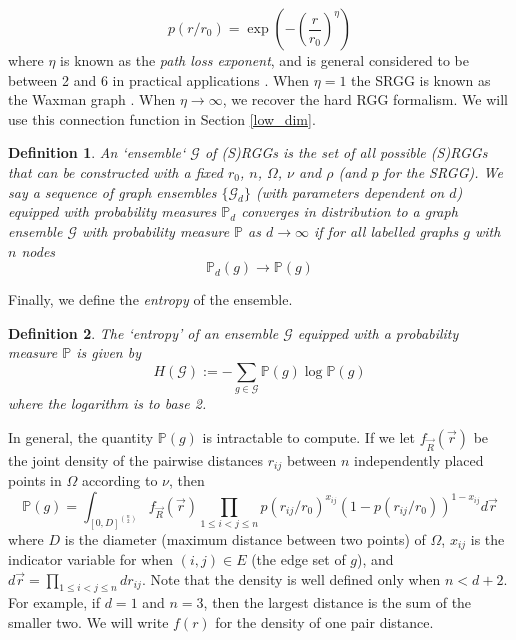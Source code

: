 \documentclass{article}
\newtheorem{definition}{Definition}
\newcommand{\tti}{\rightarrow\infty}
\newcommand{\graph}{\mathcal{G}}
\newcommand{\prob}[1]{\mathbb{P}\left(#1\right)}
\begin{document}
\begin{equation}
    p(r/r_0) = \exp\left(-\left(\frac{r}{r_0}\right)^\eta\right)
\end{equation}
where $\eta$ is known as the \textit{path loss exponent}, and is general considered to be between 2 and 6 in practical applications \cite{haenggi2009stochastic}. When $\eta=1$ the SRGG is known as the Waxman graph \cite{waxman1988routing}. When $\eta\tti$, we recover the hard RGG formalism. We will use this connection function in Section \ref{low_dim}. 
\begin{definition}
    An `ensemble` $\graph$ of (S)RGGs is the set of all possible (S)RGGs that can be constructed with a fixed $r_0$, $n$, $\Omega$, $\nu$ and $\rho$ (and $p$ for the SRGG). We say a sequence of graph ensembles $\{\graph_{d}\}$ (with parameters dependent on $d$) equipped with probability measures $\mathbb{P}_d$ converges in distribution to a graph ensemble $\graph$ with probability measure $\mathbb{P}$ as $d\tti$ if for all labelled graphs $g$ with $n$ nodes
    \begin{equation}
        \mathbb{P}_d(g) \rightarrow \prob{g}
    \end{equation}
\end{definition}
Finally, we define the \textit{entropy} of the ensemble.
\begin{definition}
    The `entropy' of an ensemble $\graph$ equipped with a probability measure $\mathbb{P}$ is given by
    \begin{equation}
        H(\graph) := -\sum_{g \in \graph} \prob{g}\log \prob{g}
    \end{equation}
    where the logarithm is to base 2.
\end{definition}
In general, the quantity $\prob{g}$ is intractable to compute. If we let $f_{\vec{R}}(\vec{r})$ be the joint density of the pairwise distances $r_{ij}$ between $n$ independently placed points in $\Omega$ according to $\nu$, then
\begin{equation}
    \label{eq:graph_probability}
    \prob{g} = \int_{[0,D]^{\binom{n}{2}}} f_{\vec{R}}(\vec{r})\prod_{1\leq i < j \leq n} p(r_{ij}/r_0)^{x_{ij}}(1-p(r_{ij}/r_0))^{1-x_{ij}} d\vec{r}
\end{equation}
where $D$ is the diameter (maximum distance between two points) of $\Omega$, $x_{ij}$ is the indicator variable for when $(i,j) \in E$ (the edge set of $g$), and $d\vec{r} = \prod_{1\leq i<j \leq n} dr_{ij}$. Note that the density is well defined only when $n < d+2$. For example, if $d=1$ and $n=3$, then the largest distance is the sum of the smaller two. We will write $f(r)$ for the density of one pair distance. 
\end{document}
